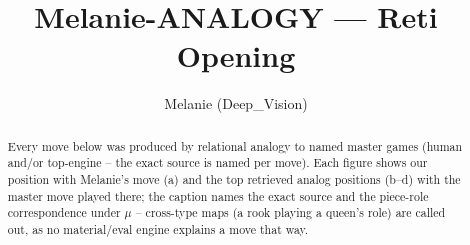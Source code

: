\documentclass[11pt]{article}
\title{Melanie-ANALOGY — Reti Opening}
\author{Melanie (Deep\_Vision)}
\date{}
\begin{document}
\maketitle

\begin{abstract}Every move below was produced by relational analogy to named master games (human and/or top-engine -- the exact source is named per move). Each figure shows our position with Melanie's move (a) and the top retrieved analog positions (b--d) with the master move played there; the caption names the exact source and the piece-role correspondence under $\mu$ -- cross-type maps (a rook playing a queen's role) are called out, as no material/eval engine explains a move that way.\end{abstract}

\begin{figure}[p]\centering
\begin{subfigure}{0.46\textwidth}\centering
\resizebox{\linewidth}{!}{%
\newchessgame
\chessboard[
  setfen={rnbq1rk1/pp2bppp/4pn2/2pp4/2P4P/1P3NP1/P2PPPB1/RNBQ1RK1 b - - 0 7},
  showmover=false,
  pgfstyle=straightmove, color=movearrow, markmove={d5-c4}
]}
\caption{}
\end{subfigure}\hfill
\begin{subfigure}{0.46\textwidth}\centering
\resizebox{\linewidth}{!}{%
\newchessgame
\chessboard[
  setfen={rnbq1rk1/ppp1bppp/4pn2/3p4/2PP4/5NP1/PP2PPBP/RNBQ1RK1 b - - 5 6},
  showmover=false,
  pgfstyle=straightmove, color=movearrow, markmove={d5-c4}
]}
\caption{}
\end{subfigure}
\\[4pt]
\begin{subfigure}{0.46\textwidth}\centering
\resizebox{\linewidth}{!}{%
\newchessgame
\chessboard[
  setfen={rnbq1rk1/ppp1bppp/4pn2/3p4/2PP4/5NP1/PP2PPBP/RNBQ1RK1 b - - 5 6},
  showmover=false,
  pgfstyle=straightmove, color=movearrow, markmove={d5-c4}
]}
\caption{}
\end{subfigure}\hfill
\begin{subfigure}{0.46\textwidth}\centering
\resizebox{\linewidth}{!}{%
\newchessgame
\chessboard[
  setfen={rnbq1rk1/ppp1bppp/4pn2/3p4/2PP4/5NP1/PP2PPBP/RNBQ1RK1 b - - 5 6},
  showmover=false,
  pgfstyle=straightmove, color=movearrow, markmove={d5-c4}
]}
\caption{}
\end{subfigure}

\end{figure}
\end{document}
